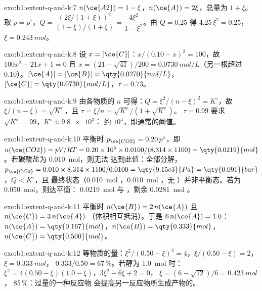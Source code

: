 \begin{solution}{exo:b1:extent-q-and-k:7}
$n(\ce{A2}) = 1 - \xi$，$n(\ce{A}) = 2\xi$，总量为 $1 + \xi$。取 $p =
p^\circ$，$Q = \dfrac{(2\xi/(1+\xi))^2}{(1-\xi)/(1+\xi)} = \dfrac{4\xi^2}{1 -
\xi^2}$。由 $Q = 0.25$ 得 $4.25\,\xi^2 = 0.25$，$\xi = \qty{0.243}{mol}$。
\end{solution}

\begin{solution}{exo:b1:extent-q-and-k:8}
设 $x = [\ce{C}]$：$x/(0.10 - x)^2 = 100$，故 $100x^2 - 21x + 1 = 0$ 且
$x = (21 - \sqrt{41})/200 = \qty{0.0730}{mol/L}$（另一根超过
0.10）。$[\ce{A}] = [\ce{B}] = \qty{0.0270}{mol/L}$，$[\ce{C}] =
\qty{0.0730}{mol/L}$，$\tau = 0.73$。
\end{solution}

\begin{solution}{exo:b1:extent-q-and-k:9}
由各物质的 $n$ 可得：$Q = \xi^2/(n - \xi)^2 = K^\circ$，故 $\xi/(n - \xi) =
\sqrt{K^\circ}$，且 $\tau = \xi/n = \sqrt{K^\circ}/(1 + \sqrt{K^\circ})$。
$\tau = 0.99$ 要求 $\sqrt{K^\circ} = 99$，$K^\circ \approx \num{9.8e3}$：
约 $10^4$，即通常的阈值。
\end{solution}

\begin{solution}{exo:b1:extent-q-and-k:10}
平衡时 $p_{\ce{CO2}} = 0.20\,p^\circ$，即 $n(\ce{CO2}) =
pV/RT = 0.20 \times 10^5 \times 0.0100/(8.314 \times 1100) =
\qty{0.0219}{mol}$。若碳酸盐为 \qty{0.010}{mol}，则无法
达到此值：全部分解，$p_{\ce{CO2}} = 0.010 \times 8.314 \times
1100/0.0100 = \qty{9.15e3}{Pa} = \qty{0.091}{bar}$，$Q < K^\circ$，且
最终状态（\qty{0.010}{mol} ，\qty{0.010}{mol} ，无
）并非平衡态。若为 \qty{0.050}{mol}，则达平衡：
\qty{0.0219}{mol}  与 ，剩余 \qty{0.0281}{mol} 。
\end{solution}

\begin{solution}{exo:b1:extent-q-and-k:11}
平衡时 $n(\ce{B}) = 2\,n(\ce{A})$ 且 $n(\ce{C}) = 3\,n(\ce{A})$
（体积相互抵消）。于是 $6\,n(\ce{A}) = 1.0$：$n(\ce{A}) =
\qty{0.167}{mol}$，$n(\ce{B}) = \qty{0.333}{mol}$，$n(\ce{C}) =
\qty{0.500}{mol}$。
\end{solution}

\begin{solution}{exo:b1:extent-q-and-k:12}
等物质的量：$\xi^2/(0.50 - \xi)^2 = 4$，$\xi/(0.50 - \xi) = 2$，
$\xi = \qty{0.333}{mol}$， $0.333/0.50 = 67\,\%$。若醇为 \qty{1.0}{mol}
时：$\xi^2 = 4(0.50 - \xi)(1.0 - \xi)$，$3\xi^2 - 6\xi + 2 = 0$，
$\xi = (6 - \sqrt{12})/6 = \qty{0.423}{mol}$， 85\,\%：过量的一种反应物
会提高另一反应物所生成产物的。
\end{solution}

